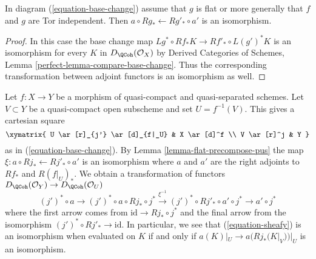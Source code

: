 \begin{lemma}
\label{lemma-flat-precompose-pus}
In diagram (\ref{equation-base-change}) assume that $g$ is flat or
more generally that $f$ and $g$ are Tor independent. Then
$a \circ Rg_* \leftarrow Rg'_* \circ a'$ is an isomorphism.
\end{lemma}

\begin{proof}
In this case the base change map
$Lg^* \circ Rf_* K \longrightarrow Rf'_* \circ L(g')^*K$
is an isomorphism for every $K$ in $D_\QCoh(\mathcal{O}_X)$ by
Derived Categories of Schemes, Lemma \ref{perfect-lemma-compare-base-change}.
Thus the corresponding transformation between adjoint functors
is an isomorphism as well.
\end{proof}

\noindent
Let $f : X \to Y$ be a morphism of quasi-compact and quasi-separated
schemes. Let $V \subset Y$ be a quasi-compact open subscheme and set
$U = f^{-1}(V)$. This gives a cartesian square
$$
\xymatrix{
U \ar[r]_{j'} \ar[d]_{f|_U} & X \ar[d]^f \\
V \ar[r]^j & Y
}
$$
as in (\ref{equation-base-change}). By Lemma \ref{lemma-flat-precompose-pus}
the map $\xi : a \circ Rj_* \leftarrow Rj'_* \circ a'$ is an isomorphism
where $a$ and $a'$ are the right adjoints to
$Rf_*$ and $R(f|_U)_*$. We obtain a transformation
of functors $D_\QCoh(\mathcal{O}_Y) \to D_\QCoh(\mathcal{O}_U)$
\begin{equation}
\label{equation-sheafy}
(j')^* \circ a \to
(j')^* \circ a \circ Rj_* \circ j^* \xrightarrow{\xi^{-1}}
(j')^* \circ Rj'_* \circ a' \circ j^* \to a' \circ j^*
\end{equation}
where the first arrow comes from $\text{id} \to Rj_* \circ j^*$
and the final arrow from the isomorphism $(j')^* \circ Rj'_* \to \text{id}$.
In particular, we see that (\ref{equation-sheafy}) is an isomorphism
when evaluated on $K$ if and only if $a(K)|_U \to a(Rj_*(K|_V))|_U$
is an isomorphism.

